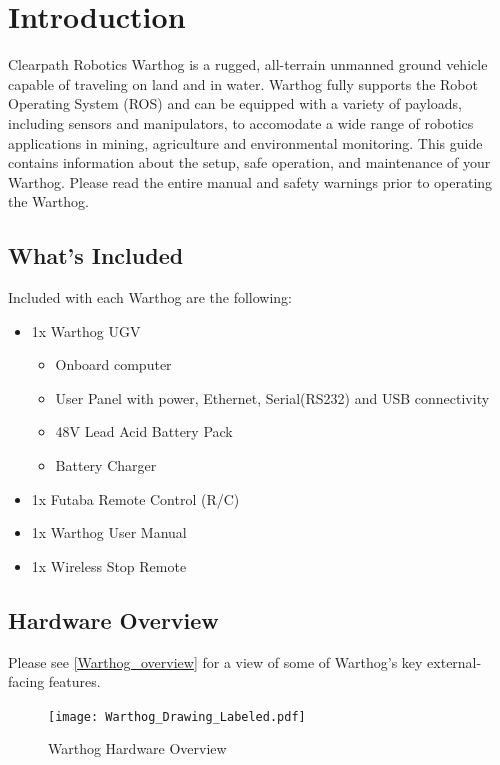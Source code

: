 \documentclass[]{clearpath-latex/clearpath-manual}
\begin{document}
\tableofcontents

\section{Introduction}
Clearpath Robotics Warthog is a rugged, all-terrain unmanned ground vehicle capable of traveling on land and in water.  Warthog fully supports the Robot Operating System (ROS) and can be equipped with a variety of payloads, including sensors and manipulators, to accomodate a wide range of robotics applications in mining, agriculture and environmental monitoring. This guide contains information about the setup, safe operation, and maintenance of your Warthog.  Please read the entire manual and safety warnings prior to operating the Warthog.

\subsection{What's Included}

Included with each Warthog are the following:

\begin{itemize}[nolistsep]
  \item 1x Warthog UGV
  \begin{itemize}
    \item{Onboard computer}
    \item{User Panel with power, Ethernet, Serial(RS232) and USB connectivity}
    \item{48V Lead Acid Battery Pack}
    \item{Battery Charger}
  \end{itemize}
  \item 1x Futaba Remote Control (R/C)
  \item 1x Warthog User Manual
  \item 1x Wireless Stop Remote
\end{itemize}



\pagebreak[4]
\subsection{Hardware Overview}

Please see \autoref{Warthog_overview} for a view of some of Warthog's key external-facing features.

\begin{figure}[h]
  \centering
  \texttt{[image: Warthog\_Drawing\_Labeled.pdf]}
  \caption{Warthog Hardware Overview}
  \label{Warthog_overview}
\end{figure}
\end{document}
